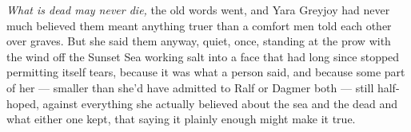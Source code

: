 \textit{What is dead may never die,} the old words went, and Yara Greyjoy had never much believed them meant anything truer than a comfort men told each other over graves. But she said them anyway, quiet, once, standing at the prow with the wind off the Sunset Sea working salt into a face that had long since stopped permitting itself tears, because it was what a person said, and because some part of her — smaller than she’d have admitted to Ralf or Dagmer both — still half-hoped, against everything she actually believed about the sea and the dead and what either one kept, that saying it plainly enough might make it true.